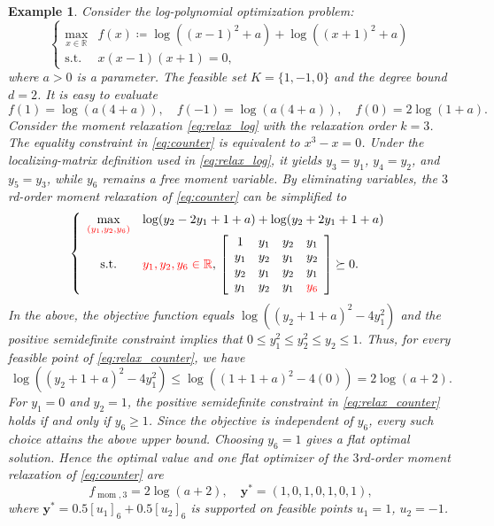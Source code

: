 \documentclass[pdflatex,sn-mathphys-num]{sn-jnl}%
\newcommand{\re}{\mathbb{R}}
\newcommand{\rd}[1]{{\color{red}#1}}
\newcommand{\vect}[1]{\boldsymbol{#1}}
\newcommand{\st}{\mathrm{s.t.}}
\theoremstyle{thmstyleone}%
\theoremstyle{thmstyletwo}%
\newtheorem{example}{Example}%
\theoremstyle{thmstylethree}%
\begin{document}
\begin{example}\label{ex:counter}
	Consider the log-polynomial optimization problem:
	\begin{equation}\label{eq:counter}
		\left\{\begin{array}{cl}
			\max\limits_{x\in\re} & f(x)\coloneqq \log((x-1)^2+a) + \log((x+1)^2+a)\\
			\st  & x(x-1)(x+1) = 0,
		\end{array}\right.
	\end{equation}
	where $a>0$ is a parameter. The feasible set $K = \{1, -1, 0\}$
	and the degree bound $d=2$.
	It is easy to evaluate
	\[ f(1) = \log (a(4+a)), \quad f(-1) = \log (a(4+a)),\quad  f(0) = 2\log (1+a). \]
	Consider the moment relaxation \eqref{eq:relax_log} with 
	the relaxation order $k=3$.
	\rd{The equality constraint in \eqref{eq:counter} is equivalent to
	$x^3-x=0$. Under the localizing-matrix definition used in
	\eqref{eq:relax_log}, it yields
	$y_3=y_1$, $y_4=y_2$, and $y_5=y_3$, while $y_6$ remains a
	free moment variable.}
	By eliminating variables, 
	the $3$rd-order moment relaxation of \eqref{eq:counter} can be simplified to 
	\begin{equation}\label{eq:relax_counter}
		\left\{\begin{array}{cl}
			\displaystyle \max_{\rd{(y_1,y_2,y_6)}} &
			\log(y_2-2y_1+1+a ) +  \log(y_2+2y_1+1+a )   \\
			\st &
			\rd{y_1,y_2,y_6\in\re},\,\left[ \begin{array}{cccc}
				1 & y_1 & y_2 & y_1 \\
				y_1 & y_2 & y_1 & y_2\\
				y_2 & y_1 & y_2 & y_1\\
				y_1 & y_2 & y_1 & \rd{y_6}\\
			\end{array}
			\right] \succeq 0.
		\end{array}\right.
	\end{equation}
	In the above, the objective function equals $\log((y_2+1+a)^2-4y_1^2)$ 
	and the positive semidefinite constraint implies that 
	$0\le y_1^2 \le y_2^2 \le y_2 \le 1.$
	Thus, \rd{for every feasible point of \eqref{eq:relax_counter}, we have}
	\[
	\log((y_2+1+a)^2-4y_1^2)\le \log((1+1+a)^2-4(0)) = 2\log(a+2).
	\]
	\rd{For $y_1=0$ and $y_2=1$, the positive semidefinite constraint in
	\eqref{eq:relax_counter} holds if and only if $y_6\geq1$.
	Since the objective is independent of $y_6$, every such choice attains
	the above upper bound. Choosing $y_6=1$ gives a flat optimal solution.}
	Hence the optimal value and \rd{one flat optimizer} of the 
	$3$rd-order moment relaxation of \eqref{eq:counter} are
	\[
	f_{\operatorname{mom},3} = 2\log(a+2),\quad
	\vect{y}^* = (1,0,1,0,1,0,1),
	\] 
	where $\vect{y}^* = 0.5[u_1]_6 + 0.5[u_2]_6$ is supported 
	on feasible points $u_1 = 1$, $u_2 = -1$.
	

\end{example}
\end{document}
